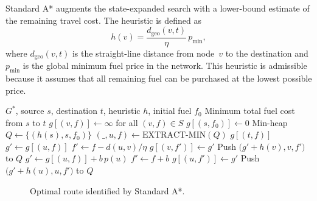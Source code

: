 Standard A* augments the state-expanded search with a lower-bound estimate of the remaining travel cost. The heuristic is defined as
\[
h(v)=\frac{d_{\mathrm{geo}}(v,t)}{\eta}\,p_{\min},
\]
where $d_{\mathrm{geo}}(v,t)$ is the straight-line distance from node~$v$ to the destination and $p_{\min}$ is the global minimum fuel price in the network. This heuristic is admissible because it assumes that all remaining fuel can be purchased at the lowest possible price.

\begin{algorithm}[H]
\caption{A* Search for Fuel-Aware Routing}
\label{alg:astar}
\begin{algorithmic}[1]
\Require $G^{*}$, source $s$, destination $t$, heuristic $h$, initial fuel $f_0$
\Ensure Minimum total fuel cost from $s$ to $t$
\State $g[(v,f)] \gets \infty$ for all $(v,f)\in S$
\State $g[(s,f_0)] \gets 0$
\State Min-heap $Q \gets \{(h(s), s, f_0)\}$
    \State $(\_,u,f) \gets \mathrm{EXTRACT\text{-}MIN}(Q)$
        \State \Return $g[(t,f)]$
    \EndIf
        \State $g' \gets g[(u,f)]$
        \State $f' \gets f-d(u,v)/\eta$
            \State $g[(v,f')] \gets g'$
            \State Push $\bigl(g'+h(v), v, f'\bigr)$ to $Q$
        \EndIf
    \EndFor
        \State $g' \gets g[(u,f)] + b\,p(u)$
        \State $f' \gets f+b$
            \State $g[(u,f')] \gets g'$
            \State Push $\bigl(g'+h(u), u, f'\bigr)$ to $Q$
        \EndIf
    \EndFor
\EndWhile
\end{algorithmic}
\end{algorithm}

\begin{figure}[ht]
\centering
{}
\caption{Optimal route identified by Standard A*.}
\label{fig:astar_route}
\end{figure}

